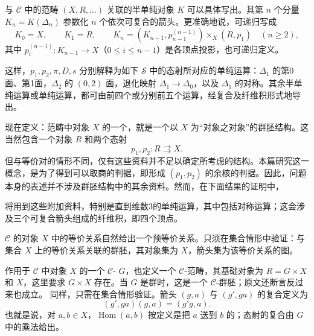 与 $\mathcal C$ 中的范畴 $(X,R,\ldots)$ 关联的半单纯对象 $K$ 可以具体写出。其第 $n$ 个分量 $K_n=K(\Delta_n)$ 参数化 $n$ 个依次可复合的箭头。更准确地说，可递归写成
\[
 K_0=X,\qquad K_1=R,\qquad
 K_n=(K_{n-1},p_{n-1}^{(n-1)})\times_X(R,p_1)
 \quad(n\geq2),
\]
其中 $p_i^{(n-1)}:K_{n-1}\to X$（$0\leq i\leq n-1$）是各顶点投影，也可递归定义。

这样，$p_1,p_2,\pi,D,s$ 分别解释为如下 $\mathcal S$ 中的态射所对应的单纯运算：$\Delta_1$ 的第0面、第1面，$\Delta_2$ 的 $(0,2)$ 面，退化映射 $\Delta_1\to\Delta_0$，以及 $\Delta_1$ 的对称。其余半单纯运算或单纯运算，都可由前四个或分别前五个运算，经复合及纤维积形式地导出。

现在定义：范畴中对象 $X$ 的一个，就是一个以 $X$ 为“对象之对象”的群胚结构。这当然包含一个对象 $R$ 和两个态射
\[
 p_1,p_2:R\rightrightarrows X.
\]
但与等价对的情形不同，仅有这些资料并不足以确定所考虑的结构。本篇研究这一概念，是为了得到可以取商的判据，即形成 $(p_1,p_2)$ 的余核的判据。因此，问题本身的表述并不涉及群胚结构中的其余资料。然而，在下面结果的证明中，

将用到这些附加资料，特别是直到维数3的单纯运算，其中包括对称运算；这会涉及三个可复合箭头组成的纤维积，即四个顶点。

$\mathcal C$ 的对象 $X$ 中的等价关系自然给出一个预等价关系。只须在集合情形中验证：与集合 $X$ 上的等价关系关联的群胚，其对象集为 $X$，箭头集为该等价关系的图。

作用于 $\mathcal C$ 中对象 $X$ 的一个 $\mathcal C$- $G$，也定义一个 $\mathcal C$-范畴，其基础对象为 $R=G\times X$ 和 $X$，这里要求 $G\times X$ 存在。当 $G$ 是群时，这是一个 $\mathcal C$-群胚；原文还断言反过来也成立。
同样，只需在集合情形验证。箭头 $(g,a)$ 与 $(g',ga)$ 的复合定义为
\[
 (g',ga)(g,a)=(g'g,a).
\]
也就是说，对 $a,b\in X$，$\operatorname{Hom}(a,b)$ 按定义是把 $a$ 送到 $b$ 的；态射的复合由 $G$ 中的乘法给出。

